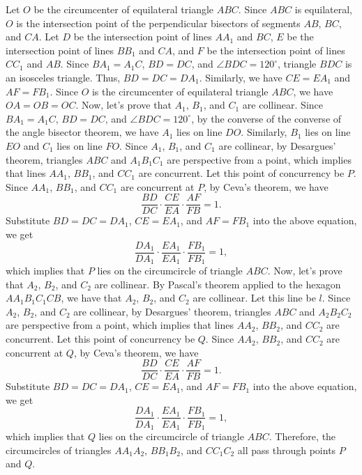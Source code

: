 Let $O$ be the circumcenter of equilateral triangle $ABC$. Since $ABC$ is equilateral, $O$ is the intersection point of the perpendicular bisectors of segments $AB$, $BC$, and $CA$.  
Let $D$ be the intersection point of lines $AA_1$ and $BC$, $E$ be the intersection point of lines $BB_1$ and $CA$, and $F$ be the intersection point of lines $CC_1$ and $AB$.  
Since $BA_1=A_1C$, $BD=DC$, and $\angle BDC = 120^\circ$, triangle $BDC$ is an isosceles triangle. Thus, $BD=DC=DA_1$.  
Similarly, we have $CE=EA_1$ and $AF=FB_1$.  
Since $O$ is the circumcenter of equilateral triangle $ABC$, we have $OA=OB=OC$.  
Now, let's prove that $A_1$, $B_1$, and $C_1$ are collinear.  
Since $BA_1=A_1C$, $BD=DC$, and $\angle BDC = 120^\circ$, by the converse of the converse of the angle bisector theorem, we have $A_1$ lies on line $DO$.  
Similarly, $B_1$ lies on line $EO$ and $C_1$ lies on line $FO$.  
Since $A_1$, $B_1$, and $C_1$ are collinear, by Desargues' theorem, triangles $ABC$ and $A_1B_1C_1$ are perspective from a point, which implies that lines $AA_1$, $BB_1$, and $CC_1$ are concurrent. Let this point of concurrency be $P$.  
Since $AA_1$, $BB_1$, and $CC_1$ are concurrent at $P$, by Ceva's theorem, we have  
\[
\frac{BD}{DC} \cdot \frac{CE}{EA} \cdot \frac{AF}{FB} = 1.
\]  
Substitute $BD=DC=DA_1$, $CE=EA_1$, and $AF=FB_1$ into the above equation, we get  
\[
\frac{DA_1}{DA_1} \cdot \frac{EA_1}{EA_1} \cdot \frac{FB_1}{FB_1} = 1,
\]  
which implies that $P$ lies on the circumcircle of triangle $ABC$.  
Now, let's prove that $A_2$, $B_2$, and $C_2$ are collinear.  
By Pascal's theorem applied to the hexagon $AA_1B_1C_1CB$, we have that $A_2$, $B_2$, and $C_2$ are collinear. Let this line be $l$.  
Since $A_2$, $B_2$, and $C_2$ are collinear, by Desargues' theorem, triangles $ABC$ and $A_2B_2C_2$ are perspective from a point, which implies that lines $AA_2$, $BB_2$, and $CC_2$ are concurrent. Let this point of concurrency be $Q$.  
Since $AA_2$, $BB_2$, and $CC_2$ are concurrent at $Q$, by Ceva's theorem, we have  
\[
\frac{BD}{DC} \cdot \frac{CE}{EA} \cdot \frac{AF}{FB} = 1.
\]  
Substitute $BD=DC=DA_1$, $CE=EA_1$, and $AF=FB_1$ into the above equation, we get  
\[
\frac{DA_1}{DA_1} \cdot \frac{EA_1}{EA_1} \cdot \frac{FB_1}{FB_1} = 1,
\]  
which implies that $Q$ lies on the circumcircle of triangle $ABC$.  
Therefore, the circumcircles of triangles $AA_1A_2$, $BB_1B_2$, and $CC_1C_2$ all pass through points $P$ and $Q$.
